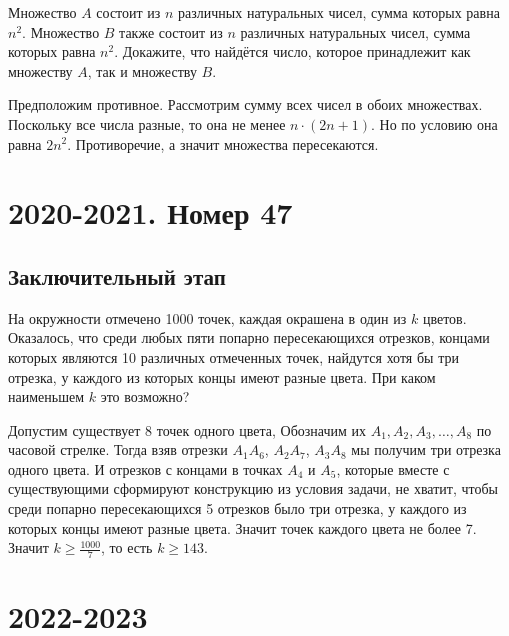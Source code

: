 \documentclass[11pt, a4paper]{common/document_template}
\begin{document}
\begin{exercise}
Множество $A$ состоит из $n$ различных натуральных чисел, сумма которых равна $n^{2}$. Множество $B$ также состоит из $n$ различных натуральных чисел, сумма которых равна $n^{2}$. Докажите, что найдётся число, которое принадлежит как множеству $A$, так и множеству $B$.
\end{exercise}

\begin{Solution}
Предположим противное. Рассмотрим сумму всех чисел в обоих множествах. Поскольку все числа разные, то она не менее $n \cdot (2n + 1)$. Но по условию она равна $2n^{2}$. Противоречие, а значит множества пересекаются.
\end{Solution}

\chapter{2020-2021. Номер 47}

\section{Заключительный этап}

\begin{exercise}
На окружности отмечено 1000 точек, каждая окрашена в один из $k$ цветов. Оказалось, что среди любых пяти попарно пересекающихся отрезков, концами которых являются 10 различных отмеченных точек, найдутся хотя бы три отрезка, у каждого из которых концы имеют разные цвета. При каком наименьшем $k$ это возможно?
\end{exercise}

\begin{Solution}
Допустим существует 8 точек одного цвета, Обозначим их $A_{1}, A_{2}, A_{3}, \dots, A_{8}$ по часовой стрелке. Тогда взяв отрезки $A_{1}A_{6}$, $A_{2}A_{7}$, $A_{3}A_{8}$ мы получим три отрезка одного цвета. И отрезков с концами в точках $A_{4}$ и $A_{5}$, которые вместе с существующими сформируют конструкцию из условия задачи, не хватит, чтобы  среди попарно пересекающихся 5 отрезков было три отрезка, у каждого из которых концы имеют разные цвета. Значит точек каждого цвета не более 7. Значит $k \geqslant \frac{1000}{7}$, то есть $k \geqslant 143$.
\end{Solution}

\chapter{2022-2023}
\end{document}

